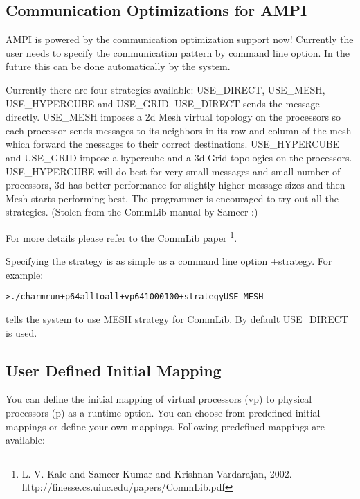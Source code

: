 \documentclass[10pt]{article}
\begin{document}
\subsection{Communication Optimizations for AMPI}
AMPI is powered by the \charmpp{} communication optimization support now!
Currently the user needs to specify the communication pattern by command
line option. In the future this can be done automatically by the system.

Currently there are four strategies available: USE\_DIRECT, USE\_MESH,
USE\_HYPERCUBE and USE\_GRID. USE\_DIRECT sends the message directly. 
USE\_MESH imposes a 2d Mesh virtual topology on the processors so each 
processor sends messages to its neighbors in its row and column of the 
mesh which forward the messages to their correct destinations. USE\_HYPERCUBE 
and USE\_GRID impose a hypercube and a 3d Grid topologies on the processors. 
USE\_HYPERCUBE will do best for very small messages and small number of 
processors, 3d has better performance for slightly higher message sizes 
and then Mesh starts performing best. The programmer is encouraged to try 
out all the strategies. (Stolen from the CommLib manual by Sameer :)

For more details please refer to the CommLib paper \footnote{L. V. Kale and 
Sameer Kumar and Krishnan Vardarajan, 2002. 
http://finesse.cs.uiuc.edu/papers/CommLib.pdf}. 

Specifying the strategy is as simple as a command line option +strategy. For
example:
\begin{alltt}
> ./charmrun +p64 alltoall +vp64 1000 100 +strategy USE\_MESH
\end{alltt}
tells the system to use MESH strategy for CommLib. By default USE\_DIRECT is
used.

\subsection{User Defined Initial Mapping}
                                                                                
You can define the initial mapping of virtual processors (vp) to physical 
processors (p) as a runtime option. You can choose from predefined initial 
mappings or define your own mappings. Following predefined mappings are 
available:
                                                                                
\end{document}
